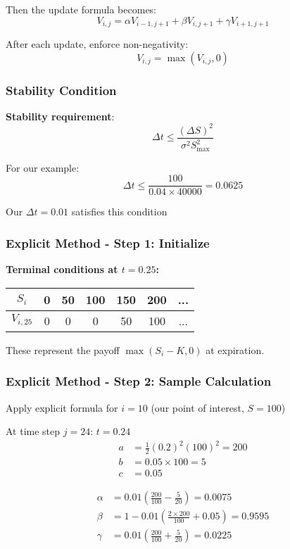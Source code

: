\documentclass[aspectratio=169]{beamer}
\begin{document}
\begin{frame}
  
Then the update formula becomes:
\[V_{i,j} = \alpha V_{i-1,j+1} + \beta V_{i,j+1} + \gamma V_{i+1,j+1}\]


\end{frame}

\begin{frame}
  After each update, enforce non-negativity:
\[V_{i,j} = \max(V_{i,j}, 0)\]
\end{frame}

\begin{frame}
\frametitle{Stability Condition}
\textbf{Stability requirement}: 
\[\Delta t \leq \frac{(\Delta S)^2}{\sigma^2 S_{\max}^2}\]

For our example:
\[\Delta t \leq \frac{100}{0.04 \times 40000} = 0.0625\]

Our $\Delta t = 0.01$ satisfies this condition \checkmark
\end{frame}

\begin{frame}
\frametitle{Explicit Method - Step 1: Initialize}
\textbf{Terminal conditions at $t = 0.25$:}

\begin{center}
\begin{tabular}{c|c|c|c|c|c|c}
$S_i$ & 0 & 50 & 100 & 150 & 200 & ... \\
\hline
$V_{i,25}$ & 0 & 0 & 0 & 50 & 100 & ...
\end{tabular}
\end{center}

These represent the payoff $\max(S_i - K, 0)$ at expiration.
\end{frame}

\begin{frame}
\frametitle{Explicit Method - Step 2: Sample Calculation}
Apply explicit formula for $i = 10$ (our point of interest, $S = 100$)

At time step $j = 24$: $t = 0.24$
\begin{align*}
a &= \frac{1}{2}(0.2)^2(100)^2 = 200 \\
b &= 0.05 \times 100 = 5 \\
c &= 0.05
\end{align*}
\end{frame}

\begin{frame}
\begin{align*}
\alpha &= 0.01 \left(\frac{200}{100} - \frac{5}{20}\right) = 0.0075 \\
\beta &= 1 - 0.01 \left(\frac{2 \times 200}{100} + 0.05\right) = 0.9595 \\
\gamma &= 0.01 \left(\frac{200}{100} + \frac{5}{20}\right) = 0.0225
\end{align*}
\end{frame}
\end{document}
